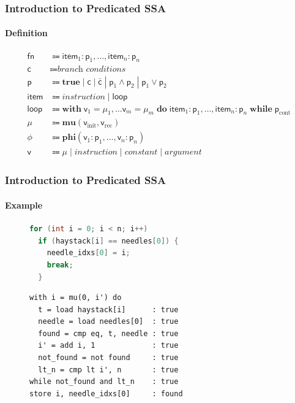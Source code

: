 \documentclass[aspectratio=169]{beamer}
\begin{document}
\begin{frame}
  \frametitle{Introduction to Predicated SSA}
  \framesubtitle{Definition}

  \begin{align*}
    \mathsf{fn} &\Coloneqq \mathsf{item}_1 : \mathsf{p}_1, \dots, \mathsf{item}_n : \mathsf{p}_n \\
    \mathsf{c} &\Coloneqq \textit{branch conditions} \\
    \mathsf{p} &\Coloneqq \textbf{true}\; |\; \mathsf{c}\; |\; \bar{\mathsf{c}}\; |\; \mathsf{p}_1 \land \mathsf{p}_2\; |\; \mathsf{p}_1 \lor \mathsf{p}_2 \\
    \mathsf{item} &\Coloneqq \textit{instruction}\; |\; \mathsf{loop} \\
    \mathsf{loop} &\Coloneqq \textbf{with}\; \mathsf{v}_1 = \mathsf{\mu}_1, \dots \mathsf{v}_m = \mathsf{\mu}_m\; \textbf{do}\; \mathsf{item}_1 : \mathsf{p}_1, \dots, \mathsf{item}_n : \mathsf{p}_n\; \textbf{while}\; \mathsf{p}_\text{cont} \\
    \mathsf{\mu} &\Coloneqq \textbf{mu}(\mathsf{v}_\text{init}, \mathsf{v}_\text{rec}) \\
    \mathsf{\phi} &\Coloneqq \textbf{phi}(\mathsf{v}_1 : \mathsf{p}_1, \dots, \mathsf{v}_n : \mathsf{p}_n) \\
    \mathsf{v} &\Coloneqq \mathsf{\mu}\; |\; \textit{instruction}\; |\; \textit{constant}\; |\; \textit{argument}
  \end{align*}
\end{frame}

\begin{frame}[fragile]
  \frametitle{Introduction to Predicated SSA}
  \framesubtitle{Example}

  \begin{figure}
    \centering
    \begin{minipage}{.45\textwidth}
      \begin{lstlisting}[language=C]
for (int i = 0; i < n; i++)
  if (haystack[i] == needles[0]) {
    needle_idxs[0] = i;
    break;
  }
      \end{lstlisting}
    \end{minipage}
    \hspace{0.2cm}
    \begin{minipage}{.45\textwidth}
      \begin{lstlisting}
with i = mu(0, i') do
  t = load haystack[i]      : true
  needle = load needles[0]  : true
  found = cmp eq, t, needle : true
  i' = add i, 1             : true
  not_found = not found     : true
  lt_n = cmp lt i', n       : true
while not_found and lt_n    : true
store i, needle_idxs[0]     : found
      \end{lstlisting}
    \end{minipage}
  \end{figure}
\end{frame}
\end{document}
